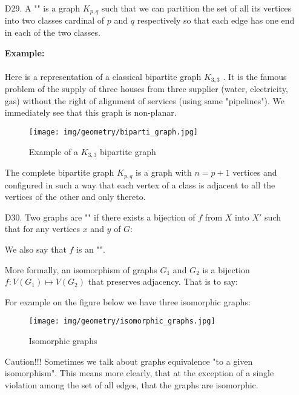 {\begin{enumerate}
	\item[D29.] A "" is a graph $K_{p,q}$ such that we can partition the set of all its vertices into two classes cardinal of $p$ and $q$ respectively so that each edge has one end in each of the two classes.
		\begin{tcolorbox}[colframe=black,colback=white,sharp corners]
		\textbf{{\Large {}}Example:}\\\\
		Here is a representation of a classical bipartite graph $K_{3,3}$ . It is the famous problem of the supply of three houses from three supplier (water, electricity, gas) without the right of alignment of services (using same "pipelines"). We immediately see that this graph is non-planar.
		\begin{figure}[H]
			\centering
			\texttt{[image: img/geometry/biparti\_graph.jpg]}
			\caption{Example of a $K_{3,3}$ bipartite graph}
		\end{figure}
		\end{tcolorbox}
		\begin{tcolorbox}[title=Remark,colframe=black,arc=10pt]
		The complete bipartite graph $K_{p,q}$ is a graph with $n=p+1$ vertices and configured in such a way that each vertex of a class is adjacent to all the vertices of the other and only thereto.
		\end{tcolorbox}	
		
		\item[D30.] Two graphs are "" if there exists a bijection of $f$ from $X$ into $X'$ such that for any vertices $x$ and $y$ of $G$:
		
		We also say that $f$ is an "".
		
		More formally, an isomorphism of graphs $G_1$ and $G_2$ is a bijection $f:V(G_1)\mapsto V(G_2)$ that preserves adjacency. That is to say:
	
	
		For example on the figure below we have three isomorphic graphs:
		\begin{figure}[H]
			\centering
			\texttt{[image: img/geometry/isomorphic\_graphs.jpg]}
			\caption{Isomorphic graphs}
		\end{figure}
		
		\begin{tcolorbox}[colback=red!5,borderline={1mm}{2mm}{red!5},arc=0mm,boxrule=0pt]
		\bcbombe Caution!!! Sometimes we talk about graphs equivalence "to a given isomorphism". This means more clearly, that at the exception of a single violation among the set of all edges, that the graphs are isomorphic.
		\end{tcolorbox}
		

\end{enumerate}}
